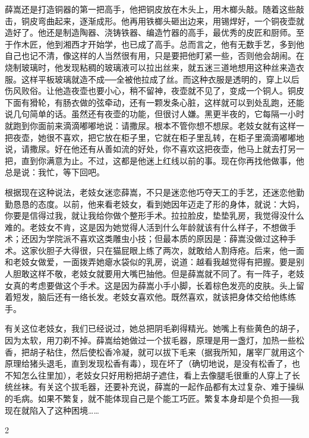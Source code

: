 薛嵩还是打造铜器的第一把高手，他把铜皮放在木头上，用木榔头敲。随着这些敲击，铜皮弯曲起来，逐渐成形。他再用铁榔头砸出边来，用锡焊好，一个铜夜壶就造好了。他还是制造陶器、浇铸铁器、编造竹器的高手，最优秀的皮匠和厨师。至于作木匠，他到湘西才开始学，也已成了高手。总而言之，他有无数手艺，多到他自己也记不清，像这样的人当然很有用，只是要把他盯紧一些，否则他会胡闹。在烧制玻璃时，他发现粘稠的玻璃液可以拉出丝来，就五迷三道地想用这种丝来造衣服。这样平板玻璃就造不成──全被他拉成了丝。而这种衣服是透明的，穿上以后伤风败俗。让他造夜壶也要小心，稍不留神，夜壶就不见了，变成一个铜人。铜皮下面有猾轮，有肠衣做的弦牵动，还有一颗发条心脏，这样就可以到处乱跑，还能说几句简单的话。虽然还有夜壶的功能，但很讨人嫌。黑更半夜的，它每隔一小时就跑到你面前来滴滴嘟嘟地说：请撒尿。根本不管你想不想尿。老妓女就有这样一把夜壶，她很不喜欢，把它放在柜子里，它就在柜子里乱转，在柜子里滴滴嘟嘟地说，请撒尿。好在他还有从善如流的好处，你不喜欢这把夜壶，他马上就去打另一把，直到你满意为止。不过，这都是他迷上红线以前的事。现在你再找他做事，他总是说：我忙，等下回吧。 

根据现在这种说法，老妓女迷恋薛嵩，不只是迷恋他巧夺天工的手艺，还迷恋他勤勤恳恳的态度。以前，他来看老妓女，看到她因年迈走了形的身体，就说：大妈，你要是信得过我，就让我给你做个整形手术。拉拉脸皮，垫垫乳房，我觉得没什么难的。老妓女不肯，这是因为她觉得人活到什么年龄就该有什么样子，不想做手术；还因为学院派不喜欢这类雕虫小技；但最本质的原因是：薛嵩没做过这种手术。这家伙胆子大得很，只在猫屁眼上练了两次，就敢给人割痔疮。后来，他一面和老妓女做爱，一面拨弄她瘪水袋似的乳房，说道：越看我越觉得有把握。要是别人胆敢这样不敬，老妓女就要用大嘴巴抽他。但是薛嵩就不同了。有一阵子，老妓女真的考虑要做这个手术。这是因为薛嵩小手小脚，长着棕色发亮的皮肤。头上留着短发，脑后还有一络长发。老妓女喜欢他。既然喜欢，就该把身体交给他练练手。 

有关这位老妓女，我们已经说过，她总把阴毛剃得精光。她嘴上有些黄色的胡子，因为太软，用刀剃不掉。薛嵩给她做过一个拔毛器，原理是用一盏灯，加热一些松香，把胡子粘住，然后使松香冷凝，就可以拔下毛来（据我所知，屠宰厂就用这个原理给猪头退毛，直到发现松香有毒），现在坏了（确切地说，是没有松香了，也不知怎么往里加），老妓女只好用粉把胡子遮住，看上去像腿毛很重的人穿上了长统丝袜。有关这个拔毛器，还要补充说，薛嵩的一起作品都有太过复杂、难于操纵的毛病。如果不繁复，就不能体现自己是个能工巧匠。繁复本身却是个负担──我现在就陷入了这种困境…… 

2 

